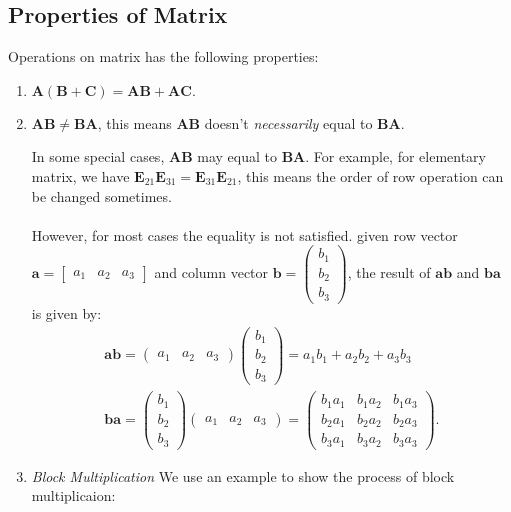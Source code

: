 \subsection{Properties of Matrix}
Operations on matrix has the following properties:
\begin{enumerate}
\item
$\bm A(\bm B+\bm C)=\bm{AB}+\bm{AC}.$
\item
$\bm{AB}\ne\bm{BA}$, this means $\bm{AB}$ doesn’t \textit{necessarily} equal to $\bm{BA}$.
\begin{remark}
In some special cases, $\bm{AB}$ may equal to $\bm{BA}$. For example, for elementary matrix, we have $\bm E_{21}\bm E_{31}=\bm E_{31}\bm E_{21}$, this means the order of row operation can be changed sometimes.\\\\
However, for most cases the equality is not satisfied. given row vector $\bm a=\begin{bmatrix}
a_1&a_2&a_3
\end{bmatrix}$ and column vector $\bm b=\begin{pmatrix}
b_1\\b_2\\b_3
\end{pmatrix}$, the result of $\bm{ab}$ and $\bm{ba}$ is given by:
\begin{gather*}
\bm{ab}=\begin{pmatrix}
a_1&a_2&a_3
\end{pmatrix}\begin{pmatrix}
b_1\\b_2\\b_3
\end{pmatrix}=a_1b_1+a_2b_2+a_3b_3\\
\bm{ba}=\begin{pmatrix}
b_1\\b_2\\b_3
\end{pmatrix}\begin{pmatrix}
a_1&a_2&a_3
\end{pmatrix}=\begin{pmatrix}
b_1a_1&b_1a_2&b_1a_3\\
b_2a_1&b_2a_2&b_2a_3\\
b_3a_1&b_3a_2&b_3a_3
\end{pmatrix}.
\end{gather*}
\end{remark}
\item
\emph{Block Multiplication} 
We use an example to show the process of block multiplicaion:

\end{enumerate}
